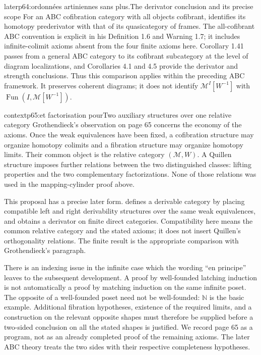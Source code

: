 \begin{dcomment}{later}{p64:ordonnées artiniennes sans plus.}{The derivator conclusion and its precise scope}
For an ABC cofibration category with all objects cofibrant, \citet[Theorem 3.33]{Lenz2018} identifies its homotopy prederivator with that of its quasicategory of frames. The all-cofibrant ABC convention is explicit in his Definition 1.6 and Warning 1.7; it includes infinite-colimit axioms absent from the four finite axioms here. Corollary 1.41 passes from a general ABC category to its cofibrant subcategory at the level of diagram localizations, and Corollaries 4.1 and 4.5 provide the derivator and strength conclusions. Thus this comparison applies within the preceding ABC framework. It preserves coherent diagrams; it does not identify $\mathcal M^I[W^{-1}]$ with $\operatorname{Fun}(I,\mathcal M[W^{-1}])$.
\end{dcomment}

\begin{dcomment}{context}{p65:et factorisation pour}{Two auxiliary structures over one relative category}
Grothendieck's observation on page 65 concerns the economy of the axioms. Once the weak equivalences have been fixed, a cofibration structure may organize homotopy colimits and a fibration structure may organize homotopy limits. Their common object is the relative category $(\mathcal M,W)$. A Quillen structure imposes further relations between the two distinguished classes: lifting properties and the two complementary factorizations. None of those relations was used in the mapping-cylinder proof above.

This proposal has a precise later form. \citet[Definition 2.25 and Corollary 2.28]{Cisinski2010} defines a derivable category by placing compatible left and right derivability structures over the same weak equivalences, and obtains a derivator on finite direct categories. Compatibility here means the common relative category and the stated axioms; it does not insert Quillen's orthogonality relations. The finite result is the appropriate comparison with Grothendieck's paragraph.

There is an indexing issue in the infinite case which the wording ``en principe'' leaves to the subsequent development. A proof by well-founded latching induction is not automatically a proof by matching induction on the same infinite poset. The opposite of a well-founded poset need not be well-founded: $\mathbb N$ is the basic example. Additional fibration hypotheses, existence of the required limits, and a construction on the relevant opposite shapes must therefore be supplied before a two-sided conclusion on all the stated shapes is justified. We record page 65 as a program, not as an already completed proof of the remaining axioms. The later ABC theory treats the two sides with their respective completeness hypotheses.
\end{dcomment}

